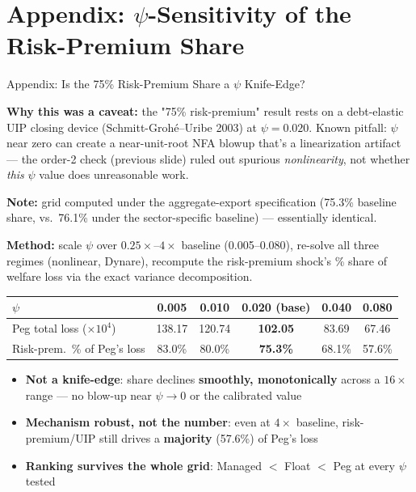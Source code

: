 \section*{Appendix: $\psi$-Sensitivity of the Risk-Premium Share}
\begin{frame}{Appendix: Is the 75\% Risk-Premium Share a $\psi$ Knife-Edge?}

{\scriptsize \textbf{Why this was a caveat:} the "75\% risk-premium" result rests on a debt-elastic UIP closing device (Schmitt-Grohé--Uribe 2003) at $\psi=0.020$. Known pitfall: $\psi$ near zero can create a near-unit-root NFA blowup that's a linearization artifact --- the order-2 check (previous slide) ruled out spurious \emph{nonlinearity}, not whether \emph{this} $\psi$ value does unreasonable work.}

{\tiny \textbf{Note:} grid computed under the aggregate-export specification (75.3\% baseline share, vs.\ 76.1\% under the sector-specific baseline) --- essentially identical.}

{\scriptsize \textbf{Method:} scale $\psi$ over $0.25\times$--$4\times$ baseline (0.005--0.080), re-solve all three regimes (nonlinear, Dynare), recompute the risk-premium shock's \% share of welfare loss via the exact variance decomposition.}

\vspace{3pt}
\begin{center}
{\scriptsize
\begin{tabular}{lccccc}
\toprule
$\psi$ & 0.005 & 0.010 & \textbf{0.020 (base)} & 0.040 & 0.080 \\
\midrule
Peg total loss ($\times10^4$) & 138.17 & 120.74 & \textbf{102.05} & 83.69 & 67.46 \\
Risk-prem.\ \% of Peg's loss & 83.0\% & 80.0\% & \textbf{75.3\%} & 68.1\% & 57.6\% \\
\bottomrule
\end{tabular}}
\end{center}

{\scriptsize
\begin{itemize}\setlength{\itemsep}{1pt}\setlength{\topsep}{2pt}
\item \textbf{Not a knife-edge}: share declines \textbf{smoothly, monotonically} across a $16\times$ range --- no blow-up near $\psi\to0$ or the calibrated value
\item \textbf{Mechanism robust, not the number}: even at $4\times$ baseline, risk-premium/UIP still drives a \textbf{majority} (57.6\%) of Peg's loss
\item \textbf{Ranking survives the whole grid}: Managed $<$ Float $<$ Peg at every $\psi$ tested
\end{itemize}}

\end{frame}

